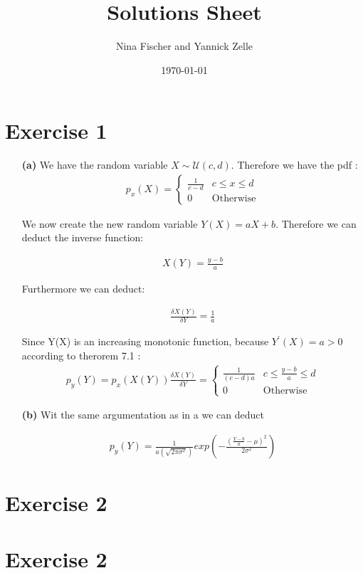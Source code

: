 \documentclass{article}
\title{Solutions Sheet}
\author{Nina Fischer and Yannick Zelle}
\date\today
\begin{document}
\maketitle %




\section*{Exercise 1}
\begin{itemize}
    \item [\textbf{(a)}] We have the random variable $X \sim \mathcal{U}(c,d)$. Therefore we have the pdf :
 \begin{align*}
 p_x(X) =   \begin{cases}
    \frac{1}{c-d} &c \leq x \leq d \\
    0 &\text{Otherwise}
    \end{cases}
\end{align*}

We now create the new random variable $Y(X)=aX+b$. Therefore we can deduct the inverse function:

\begin{align*}
    X(Y) = \frac{y-b}{a}
\end{align*}

Furthermore we can deduct:

\begin{align*}
    \frac{\delta X(Y)}{\delta Y} = \frac{1}{a}
\end{align*}

Since Y(X) is an increasing monotonic function, because $Y^{\prime}(X)=a>0$ according to therorem 7.1 :
\begin{align*}
p_y(Y) = p_x(X(Y)) \frac{\delta X(Y)}{\delta Y} = \begin{cases}
    \frac{1}{(c-d)a} &c \leq \frac{y-b}{a} \leq d \\
    0 &\text{Otherwise}
    \end{cases}
\end{align*}

\item[\textbf{(b)}] Wit the same argumentation as in a we can deduct

\begin{align*}
    p_y(Y)= \frac{1}{a(\sqrt{2\pi \sigma^2})}exp(-\frac{(\frac{Y-b}{a}- \mu)^2}{2 \sigma^2})
\end{align*}  
\end{itemize}

\section*{Exercise 2}

\section*{Exercise 2}
\end{document}
